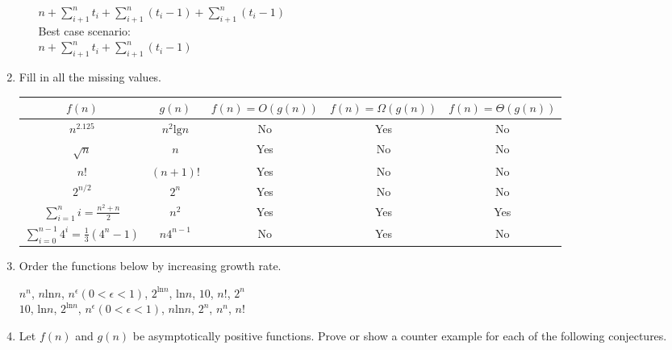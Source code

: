\documentclass{article}
\begin{document}
\begin{enumerate}
\begin{enumerate}
                    $n + \sum_{i+1}^{n}t_i + \sum_{i+1}^{n}(t_i-1) + \sum_{i+1}^{n}(t_i-1)$\\
                    Best case scenario:\\
                    $n + \sum_{i+1}^{n}t_i + \sum_{i+1}^{n}(t_i-1)$
                \end{enumerate}
            \item Fill in all the missing values.
                \begin{center}
                    \begin{tabular}{|c | c | c | c | c|}
                        \hline
                        $f(n)$ & $g(n)$ & $f(n)=O(g(n))$ & $f(n)=\Omega(g(n))$ & $f(n)=\Theta(g(n))$\\
                        \hline
                        \hline
                        $n^{2.125}$ & $n^2\text{lg}n$ & No & Yes & No\\
                        \hline
                        $\sqrt{n}$ & $n$ & Yes & No & No\\
                        \hline
                        $n!$ & $(n+1)!$ & Yes & No & No\\
                        \hline
                        $2^{n/2}$ & $2^n$ & Yes & No & No\\
                        \hline
                        $\sum_{i=1}^{n}i= \frac{n^2+n}{2}$ & $n^2$ & Yes & Yes & Yes\\
                        \hline
                        $\sum_{i=0}^{n-1}4^i=\frac{1}{3}(4^n-1)$ & $n4^{n-1}$ & No & Yes & No\\
                        \hline
                    \end{tabular}
                \end{center}
            \item Order the functions below by increasing growth rate.
                \begin{center}
                    $n^n$, $n$ln$n$, $n^\epsilon (0<\epsilon<1)$, $2^{\text{ln}n}$, $\text{ln}n$, $10$, $n!$, $2^n$\\
                    $10$, ln$n$, $2^{\text{ln}n}$, $n^\epsilon (0<\epsilon<1)$, $n$ln$n$, $2^n$, $n^n$, $n!$
                \end{center}
            \item Let $f(n)$ and $g(n)$ be asymptotically positive functions. Prove or show a counter example for each of the following conjectures.
                \begin{enumerate}

\end{enumerate}
\end{enumerate}
\end{document}
